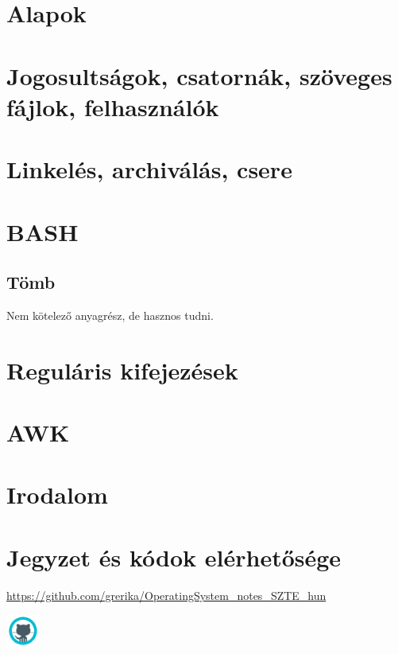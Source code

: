 \documentclass[a4paper]{article}
\begin{document}
\pagebreak
\tableofcontents

\cleardoublepage

\section{Alapok}

	

\section{Jogosultságok, csatornák, szöveges fájlok, felhasználók}
	

\section{Linkelés, archiválás, csere}
	
	
\section{BASH}
	
	
	\subsection{Tömb}
	Nem kötelező anyagrész, de hasznos tudni.
		

\section{Reguláris kifejezések}
	
	
\section{AWK}
	
	


\section{Irodalom}
    


\section*{Jegyzet és kódok elérhetősége}
\begin{center}
\url{https://github.com/grerika/OperatingSystem_notes_SZTE_hun}

\includegraphics[width=3em]{pics/icons8-github}
\end{center}
\end{document}
